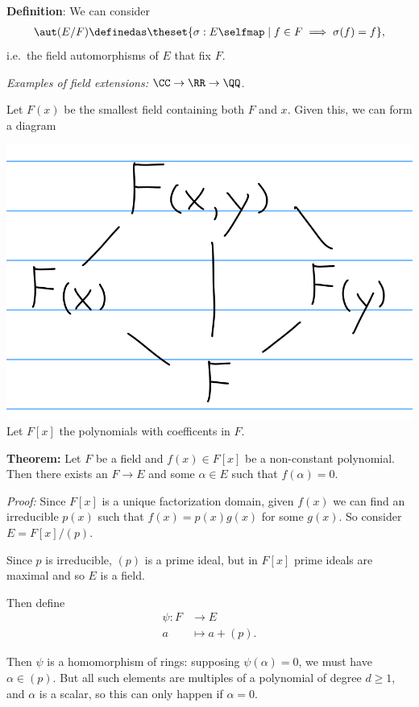 \textbf{Definition}: We can consider
\begin{align*}
\aut(E/F) \definedas \theset{\sigma: E \selfmap \mid f\in F \implies \sigma(f) = f},
\end{align*} i.e.~the field automorphisms of \(E\) that fix \(F\).

\emph{Examples of field extensions:} \(\CC \to \RR \to \QQ\).

Let \(F(x)\) be the smallest field containing both \(F\) and \(x\).
Given this, we can form a diagram

\includegraphics{figures/2019-09-10-10:06.png}\\

Let \(F[x]\) the polynomials with coefficents in \(F\).

\textbf{Theorem:} Let \(F\) be a field and \(f(x) \in F[x]\) be a
non-constant polynomial. Then there exists an \(F \to E\) and some
\(\alpha \in E\) such that \(f(\alpha) = 0\).

\emph{Proof:} Since \(F[x]\) is a unique factorization domain, given
\(f(x)\) we can find an irreducible \(p(x)\) such that
\(f(x) = p(x) g(x)\) for some \(g(x)\). So consider \(E = F[x] / (p)\).

Since \(p\) is irreducible, \((p)\) is a prime ideal, but in \(F[x]\)
prime ideals are maximal and so \(E\) is a field.

Then define \begin{align*}
\psi: F &\to E \\
a &\mapsto a + (p)
.\end{align*}

Then \(\psi\) is a homomorphism of rings: supposing
\(\psi(\alpha) = 0\), we must have \(\alpha \in (p)\). But all such
elements are multiples of a polynomial of degree \(d \geq 1\), and
\(\alpha\) is a scalar, so this can only happen if \(\alpha = 0\).


